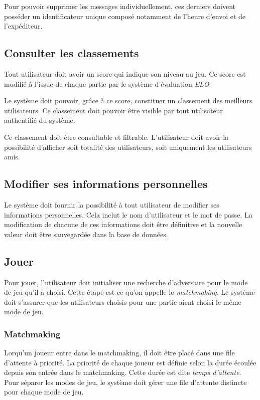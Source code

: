 Pour pouvoir supprimer les messages individuellement, ces
derniers doivent posséder un identificateur unique composé
notamment de l'heure d'envoi et de l'expéditeur.

\subsection{Consulter les classements}

Tout utilisateur doit avoir un score qui indique son niveau
au jeu. Ce score est modifié à l'issue de chaque partie
par le système d'évaluation \emph{ELO}.

Le système doit pouvoir, grâce à ce score, constituer
un classement des meilleurs utilisateurs. Ce classement doit
pouvoir être visible par tout utilisateur authentifié du système.

Ce classement doit être consultable et filtrable.
L'utilisateur doit avoir la possibilité d'afficher
soit totalité des utilisateurs, soit uniquement les utilisateurs
amis.

\subsection{Modifier ses informations personnelles}

Le système doit fournir la possibilité à tout utilisateur de
modifier ses informations personnelles. Cela inclut 
le nom d'utilisateur et le mot de passe.
La modification de chacune de ces informations doit être
définitive et la nouvelle valeur doit être
sauvegardée dans la base de données.

\subsection{Jouer}

Pour jouer, l'utilisateur doit initialiser une recherche
d'adversaire pour le mode de
jeu qu'il a choisi. Cette étape est ce qu'on appelle le
\emph{matchmaking}. Le système doit s'assurer que les
utilisateurs choisis pour une partie aient choisi le même
mode de jeu.

\subsubsection{Matchmaking}

Lorqu'un joueur entre dans le matchmaking, il doit être
placé dans une file d'attente à priorité.
La priorité de chaque joueur est définie selon la durée
écoulée
depuis son entrée dans le matchmaking. Cette durée est dite \emph{temps d'attente}.
Pour séparer les modes de jeu, le système doit gérer une
file d'attente distincte pour chaque mode de jeu.

